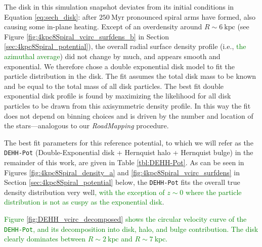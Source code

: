 \documentclass[iop,revtex4,numberedappendix,appendixfloats]{emulateapj}
\newcommand{\RM}{{\sl RoadMapping}}
\newcommand{\NEW}[1]{\textcolor{Green}{#1}}
\newcommand{\OLD}[1]{}
\begin{document}
The disk in this simulation snapshot deviates from its initial conditions in Equation \eqref{eq:sech_disk}: after $250~\text{Myr}$ pronounced spiral arms have formed, also causing some in-plane heating. Except of an overdensity around $R\sim6~\text{kpc}$ (see Figure \ref{fig:4kpc8Spiral_vcirc_surfdens_b} in Section \ref{sec:4kpc8Spiral_potential}), the overall radial surface density profile (i.e., \OLD{when averaging over the $\phi$ coordinate}\NEW{the azimuthal average}) did not change by much, and appears smooth and exponential. We therefore chose a double exponential disk model to fit the particle distribution in the disk. The fit assumes the total disk mass to be known and be equal to the total mass of all disk particles. The best fit double exponential disk profile is found by maximizing the likelihood for all disk particles to be drawn from this axisymmetric density profile. In this way the fit does not depend on binning choices and is driven by the number and location of the stars---analogous to our \RM{} procedure. 

The best fit parameters for this reference potential, to which we will refer as the \texttt{DEHH-Pot} (Double-Exponential disk + Hernquist halo + Hernquist bulge) in the remainder of this work, are given in Table \ref{tbl:DEHH-Pot}. As can be seen in Figures \NEW{\ref{fig:4kpc8Spiral_density_a}}\OLD{\ref{fig:4kpc8Spiral_density}} and \ref{fig:4kpc8Spiral_vcirc_surfdens} in Section \ref{sec:4kpc8Spiral_potential} below, the \texttt{DEHH-Pot} fits the overall true density distribution very well\NEW{, with the exception of $z\sim0$ where the particle distribution is not as cuspy as the exponential disk}. \OLD{Its density profile might be a little steeper around $z\sim 0$ than the actual particle distribution, but this should not affect the overall discussion, as the radial density, surface density and disk-to-halo ratio profiles are so well reproduced.}

\NEW{Figure \ref{fig:DEHH_vcirc_decomposed} shows the circular velocity curve of the \texttt{DEHH-Pot}, and its decomposition into disk, halo, and bulge contribution. The disk clearly dominates between $R\sim2~\text{kpc}$ and $R\sim7~\text{kpc}$.}
\end{document}
